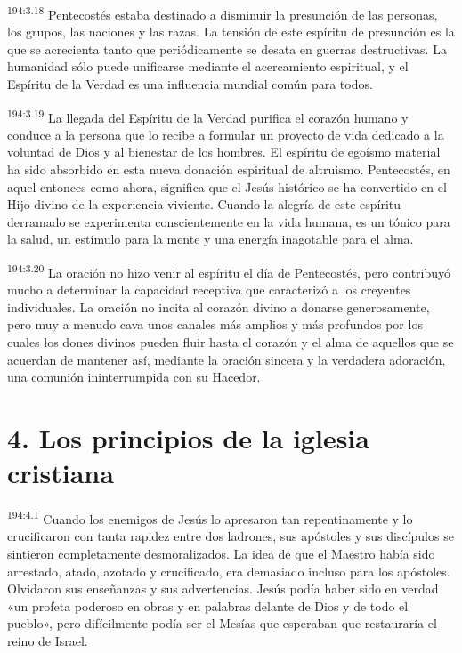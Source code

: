 \par 
\textsuperscript{194:3.18} Pentecostés estaba destinado a disminuir la presunción de las personas, los grupos, las naciones y las razas. La tensión de este espíritu de presunción es la que se acrecienta tanto que periódicamente se desata en guerras destructivas. La humanidad sólo puede unificarse mediante el acercamiento espiritual, y el Espíritu de la Verdad es una influencia mundial común para todos.

\par 
\textsuperscript{194:3.19} La llegada del Espíritu de la Verdad purifica el corazón humano y conduce a la persona que lo recibe a formular un proyecto de vida dedicado a la voluntad de Dios y al bienestar de los hombres. El espíritu de egoísmo material ha sido absorbido en esta nueva donación espiritual de altruismo. Pentecostés, en aquel entonces como ahora, significa que el Jesús histórico se ha convertido en el Hijo divino de la experiencia viviente. Cuando la alegría de este espíritu derramado se experimenta conscientemente en la vida humana, es un tónico para la salud, un estímulo para la mente y una energía inagotable para el alma.

\par 
\textsuperscript{194:3.20} La oración no hizo venir al espíritu el día de Pentecostés, pero contribuyó mucho a determinar la capacidad receptiva que caracterizó a los creyentes individuales. La oración no incita al corazón divino a donarse generosamente, pero muy a menudo cava unos canales más amplios y más profundos por los cuales los dones divinos pueden fluir hasta el corazón y el alma de aquellos que se acuerdan de mantener así, mediante la oración sincera y la verdadera adoración, una comunión ininterrumpida con su Hacedor.

\section*{4. Los principios de la iglesia cristiana}
\par 
\textsuperscript{194:4.1} Cuando los enemigos de Jesús lo apresaron tan repentinamente y lo crucificaron con tanta rapidez entre dos ladrones, sus apóstoles y sus discípulos se sintieron completamente desmoralizados. La idea de que el Maestro había sido arrestado, atado, azotado y crucificado, era demasiado incluso para los apóstoles. Olvidaron sus enseñanzas y sus advertencias. Jesús podía haber sido en verdad «un profeta poderoso en obras y en palabras delante de Dios y de todo el pueblo», pero difícilmente podía ser el Mesías que esperaban que restauraría el reino de Israel.

